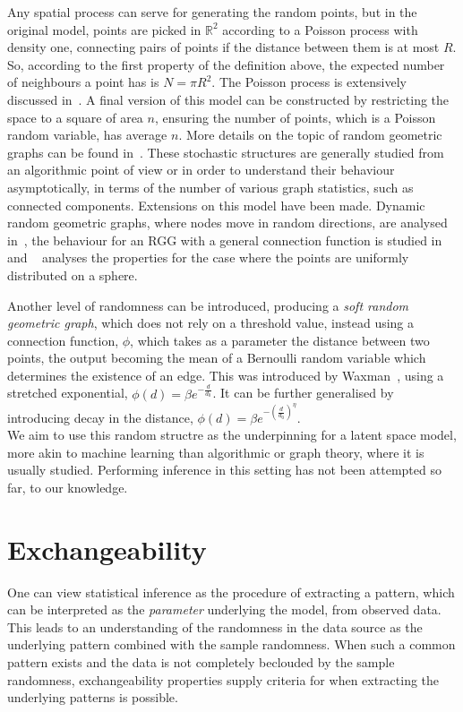 \documentclass[12pt]{report}
\newcommand{\mb}[1]{\mathbb{#1}}
\begin{document}
Any spatial process can serve for generating the random points, but in the original model, points are picked in $\mb{R}^2$ according to a Poisson process with density one, connecting pairs of points if the distance between them is at most $R$. So, according to the first property of the definition above, the expected number of neighbours a point has is $N = \pi R^2$. The Poisson process is extensively discussed in~\parencite{poisson}. A final version of this model can be constructed by restricting the space to a square of area $n$, ensuring the number of points, which is a Poisson random variable, has average $n$. More details on the topic of random geometric graphs can be found in~\parencite{penrosergg}. These stochastic structures are generally studied from an algorithmic point of view or in order to understand their behaviour asymptotically, in terms of the number of various graph statistics, such as connected components. Extensions on this model have been made. Dynamic random geometric graphs, where nodes move in random directions, are analysed in~\parencite{dynamicrgg}, the behaviour for an RGG with a general connection function is studied in~\parencite{generalrgg} and ~\parencite{sphericalrgg} analyses the properties for the case where the points are uniformly distributed on a sphere.

Another level of randomness can be introduced, producing a \textit{soft random geometric graph}, which does not rely on a threshold value, instead using a connection function, $\phi$, which takes as a parameter the distance between two points, the output becoming the mean of a Bernoulli random variable which determines the existence of an edge. This was introduced by Waxman~\parencite{softrgg}, using a stretched exponential, $\phi(d) = \beta e^{-\frac{d}{d_0}}$. It can be further generalised by introducing decay in the distance, $\phi(d) = \beta e^{-\left(\frac{d}{d_0}\right)^\eta}$. \\

We aim to use this random structre as the underpinning for a latent space model, more akin to machine learning than algorithmic or graph theory, where it is usually studied. Performing inference in this setting has not been attempted so far, to our knowledge. \\

\section{Exchangeability}

One can view statistical inference as the procedure of extracting a pattern, which can be interpreted as the \textit{parameter} underlying the model, from observed data. This leads to an understanding of the randomness in the data source as the underlying pattern combined with the sample randomness. When such a common pattern exists and the data is not completely beclouded by the sample randomness, exchangeability properties supply criteria for when extracting the underlying patterns is possible. \\
\end{document}
